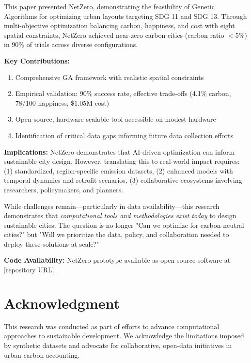\documentclass[conference]{IEEEtran}
\begin{document}
This paper presented NetZero, demonstrating the feasibility of Genetic Algorithms for optimizing urban layouts targeting SDG 11 and SDG 13. Through multi-objective optimization balancing carbon, happiness, and cost with eight spatial constraints, NetZero achieved near-zero carbon cities (carbon ratio $<$5\%) in 90\% of trials across diverse configurations.

\textbf{Key Contributions:}
\begin{enumerate}
    \item Comprehensive GA framework with realistic spatial constraints
    \item Empirical validation: 90\% success rate, effective trade-offs (4.1\% carbon, 78/100 happiness, \$1.05M cost)
    \item Open-source, hardware-scalable tool accessible on modest hardware
    \item Identification of critical data gaps informing future data collection efforts
\end{enumerate}

\textbf{Implications:} NetZero demonstrates that AI-driven optimization can inform sustainable city design. However, translating this to real-world impact requires: (1) standardized, region-specific emission datasets, (2) enhanced models with temporal dynamics and retrofit scenarios, (3) collaborative ecosystems involving researchers, policymakers, and planners.

While challenges remain—particularly in data availability—this research demonstrates that \textit{computational tools and methodologies exist today} to design sustainable cities. The question is no longer "Can we optimize for carbon-neutral cities?" but "Will we prioritize the data, policy, and collaboration needed to deploy these solutions at scale?"

\textbf{Code Availability:} NetZero prototype available as open-source software at [repository URL].

\section*{Acknowledgment}

This research was conducted as part of efforts to advance computational approaches to sustainable development. We acknowledge the limitations imposed by synthetic datasets and advocate for collaborative, open-data initiatives in urban carbon accounting.
\end{document}
